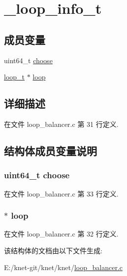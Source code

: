 \hypertarget{struct__loop__info__t}{}\section{\+\_\+loop\+\_\+info\+\_\+t}
\label{struct__loop__info__t}
\subsection*{成员变量}
\begin{DoxyCompactItemize}
\item 
uint64\+\_\+t \hyperlink{struct__loop__info__t_acc2a773122daf750cd1233fd5b75cd13}{choose}
\item 
\hyperlink{config_8h_a9c3ad1cd2de83e09f3a7b59fa82c94ee}{loop\+\_\+t} $\ast$ \hyperlink{struct__loop__info__t_a3786fde367e7f2f7b7aa2b4711db5a0f}{loop}
\end{DoxyCompactItemize}


\subsection{详细描述}


在文件 loop\+\_\+balancer.\+c 第 31 行定义.



\subsection{结构体成员变量说明}
\hypertarget{struct__loop__info__t_acc2a773122daf750cd1233fd5b75cd13}{}
\subsubsection[{choose}]{\setlength{\rightskip}{0pt plus 5cm}uint64\+\_\+t choose}\label{struct__loop__info__t_acc2a773122daf750cd1233fd5b75cd13}


在文件 loop\+\_\+balancer.\+c 第 33 行定义.

\hypertarget{struct__loop__info__t_a3786fde367e7f2f7b7aa2b4711db5a0f}{}
\subsubsection[{loop}]{$\ast$ loop}\label{struct__loop__info__t_a3786fde367e7f2f7b7aa2b4711db5a0f}


在文件 loop\+\_\+balancer.\+c 第 32 行定义.



该结构体的文档由以下文件生成\+:\begin{DoxyCompactItemize}
\item 
E\+:/knet-\/git/knet/knet/\hyperlink{loop__balancer_8c}{loop\+\_\+balancer.\+c}\end{DoxyCompactItemize}
